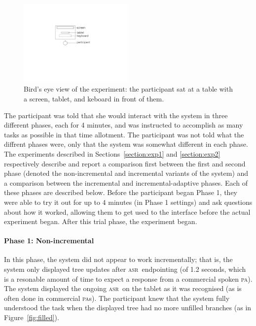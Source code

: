 \documentclass[11pt]{article}
\newcommand{\asr}[0]{\textsc{asr}}
\newcommand{\pa}[0]{\textsc{pa}}
\begin{document}
\begin{figure}[ht]
  \centering
      \includegraphics[width=0.5\textwidth]{figures/dataview.pdf}	
      \caption{Bird's eye view of the experiment: the participant sat at a table with a screen, tablet, and keboard in front of them. \label{fig:dataview}}
\end{figure}

The participant was told that she would interact with the system in three different phases, each for 4 minutes, and was instructed to accomplish as many tasks as possible in that time allotment. The participant was not told what the diffrent phases were, only that the system was somewhat different in each phase. The experiments described in Sections~\ref{section:exp1} and \ref{section:exp2} respectively describe and report a comparison first between the first and second phase (denoted the non-incremental and incremental variants of the system) and a comparison between the incremental and incremental-adaptive phases. Each of these phases are described below. Before the participant began Phase 1, they were able to try it out for up to 4 minutes (in Phase 1 settings) and ask questions about how it worked, allowing them to get used to the interface before the actual experiment began. After this trial phase, the experiment began.

\paragraph{Phase 1: Non-incremental} In this phase, the system did not appear to work incrementally; that is, the system only displayed tree updates after \asr\ endpointing (of 1.2 seconds, which is a resonable amount of time to expect a response from a commercial spoken \pa). The system displayed the ongoing \asr\ on the tablet as it was recognised (as is often done in commercial \pa s). The participant knew that the system fully understood the task when the displayed tree had no more unfilled branches (as in Figure~\ref{fig:filled}). 
\end{document}
